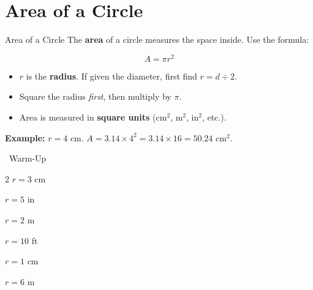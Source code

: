 \section{Area of a Circle}

\begin{quickReview}{Area of a Circle}
The \textbf{area} of a circle measures the space inside. Use the formula:

\[A = \pi r^2\]

\begin{itemize}[leftmargin=*]
    \item $r$ is the \textbf{radius}. If given the diameter, first find $r = d \div 2$.
    \item Square the radius \emph{first}, then multiply by $\pi$.
    \item Area is measured in \textbf{square units} (cm$^2$, m$^2$, in$^2$, etc.).
\end{itemize}

\medskip
\textbf{Example:} $r = 4$ cm. \quad $A = 3.14 \times 4^2 = 3.14 \times 16 = 50.24$ cm$^2$.
\end{quickReview}

\begin{practiceBox}[funGreen]{\faSun~Warm-Up}


\begin{multicols}{2}
\prob $r = 3$ cm \answerBlank[3cm]

\prob $r = 5$ in \answerBlank[3cm]

\prob $r = 2$ m \answerBlank[3cm]

\prob $r = 10$ ft \answerBlank[3cm]

\prob $r = 1$ cm \answerBlank[3cm]

\prob $r = 6$ m \answerBlank[3cm]
\end{multicols}
\end{practiceBox}

